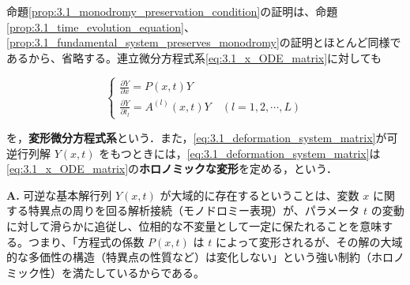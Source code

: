 命題\ref{prop:3.1_monodromy_preservation_condition}の証明は、命題\ref{prop:3.1_time_evolution_equation}、\ref{prop:3.1_fundamental_system_preserves_monodromy}の証明とほとんど同様であるから、省略する。連立微分方程式系\eqref{eq:3.1_x_ODE_matrix}に対しても

\begin{equation}\label{eq:3.1_deformation_system_matrix}
  \begin{cases}
    \displaystyle \frac{\partial Y}{\partial x} = P(x,t)Y \\[4mm]
    \displaystyle \frac{\partial Y}{\partial t_l} = A^{(l)}(x,t)Y \quad (l=1,2,\cdots,L)
  \end{cases}
\end{equation}

を，\textbf{変形微分方程式系}という．また，\eqref{eq:3.1_deformation_system_matrix}が可逆行列解 $Y(x,t)$ をもつときには，\eqref{eq:3.1_deformation_system_matrix}は\eqref{eq:3.1_x_ODE_matrix}の\textbf{ホロノミックな変形}を定める，という．

\begin{Q}
\textbf{A.} 可逆な基本解行列 $Y(x,t)$ が大域的に存在するということは、変数 $x$ に関する特異点の周りを回る解析接続（モノドロミー表現）が、パラメータ $t$ の変動に対して滑らかに追従し、位相的な不変量として一定に保たれることを意味する。つまり、「方程式の係数 $P(x,t)$ は $t$ によって変形されるが、その解の大域的な多価性の構造（特異点の性質など）は変化しない」という強い制約（ホロノミック性）を満たしているからである。
\end{Q}

